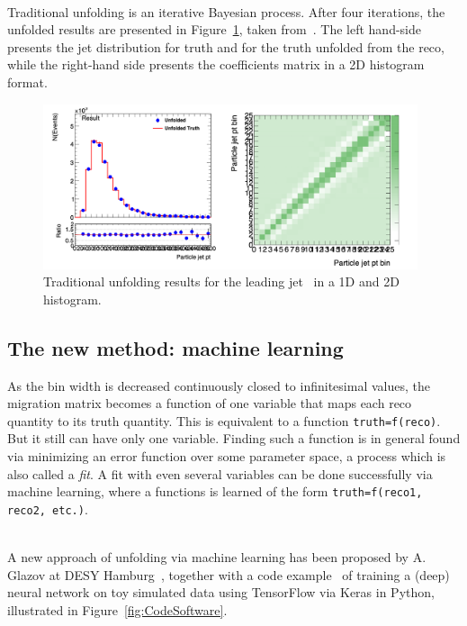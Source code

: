 \ \\Traditional unfolding is an iterative Bayesian process. After four iterations, the unfolded results are presented in Figure~\ref{fig:2DMigrationMatrix}, taken from~\cite{ReportYichenLi}. The left hand-side presents the jet distribution for truth and for the truth unfolded from the reco, while the right-hand side presents the coefficients matrix in a 2D histogram format.

\begin{figure}[h]
  \centering
  \includegraphics[width=0.98\textwidth]{./plots/TraditionalUnfoldingResults.png}
  \caption{Traditional unfolding results for the leading jet \pt~in a 1D and 2D histogram.}
  \label{fig:2DMigrationMatrix}
\end{figure}

\subsection{The new method: machine learning}
\label{sec:UnfoldingMachine Learning}

As the bin width is decreased continuously closed to infinitesimal values, the migration matrix becomes a function of one variable that maps each reco quantity to its truth quantity. This is equivalent to a function \texttt{truth=f(reco)}. But it still can have only one variable. Finding such a function is in general found via minimizing an error function over some parameter space, a process which is also called a \emph{fit}. A fit with even several variables can be done successfully via machine learning, where a functions is learned of the form \texttt{truth=f(reco1, reco2, etc.)}. 

\ \\A new approach of unfolding via machine learning has been proposed by A. Glazov at DESY Hamburg~\cite{AGlazov}, together with a code example~\cite{AGlazovCode} of training a (deep) neural network on toy simulated data using TensorFlow via Keras in Python, illustrated in Figure~\ref{fig:CodeSoftware}. 

